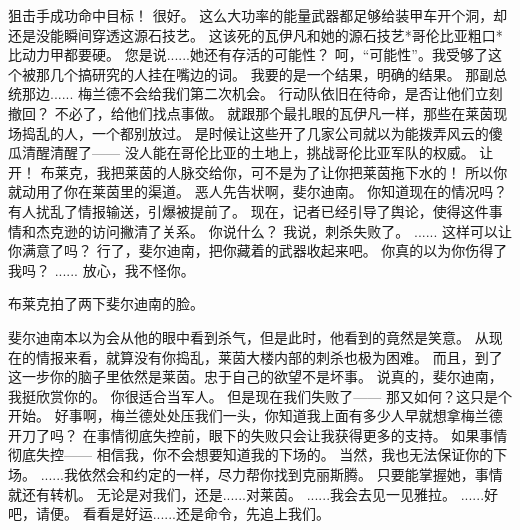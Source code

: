 \documentclass[openany]{book}
\begin{document}
\begin{dialogue}
     狙击手成功命中目标！
     很好。
     这么大功率的能量武器都足够给装甲车开个洞，却还是没能瞬间穿透这源石技艺。
     这该死的瓦伊凡和她的源石技艺*哥伦比亚粗口*比动力甲都要硬。
     您是说......她还有存活的可能性？
     呵，“可能性”。我受够了这个被那几个搞研究的人挂在嘴边的词。
     我要的是一个结果，明确的结果。
     那副总统那边......
     梅兰德不会给我们第二次机会。
     行动队依旧在待命，是否让他们立刻撤回？
     不必了，给他们找点事做。
     就跟那个最扎眼的瓦伊凡一样，那些在莱茵现场捣乱的人，一个都别放过。
     是时候让这些开了几家公司就以为能拨弄风云的傻瓜清醒清醒了——
     没人能在哥伦比亚的土地上，挑战哥伦比亚军队的权威。
     让开！
     布莱克，我把莱茵的人脉交给你，可不是为了让你把莱茵拖下水的！
     所以你就动用了你在莱茵里的渠道。
     恶人先告状啊，斐尔迪南。
     你知道现在的情况吗？
     有人扰乱了情报输送，引爆被提前了。
     现在，记者已经引导了舆论，使得这件事情和杰克逊的访问撇清了关系。
     你说什么？
     我说，刺杀失败了。
     ......
     这样可以让你满意了吗？
     行了，斐尔迪南，把你藏着的武器收起来吧。
     你真的以为你伤得了我吗？
     ......
     放心，我不怪你。\par
    布莱克拍了两下斐尔迪南的脸。\par
    斐尔迪南本以为会从他的眼中看到杀气，但是此时，他看到的竟然是笑意。
     从现在的情报来看，就算没有你捣乱，莱茵大楼内部的刺杀也极为困难。
     而且，到了这一步你的脑子里依然是莱茵。忠于自己的欲望不是坏事。
     说真的，斐尔迪南，我挺欣赏你的。
     你很适合当军人。
     但是现在我们失败了——
     那又如何？这只是个开始。
     好事啊，梅兰德处处压我们一头，你知道我上面有多少人早就想拿梅兰德开刀了吗？
     在事情彻底失控前，眼下的失败只会让我获得更多的支持。
     如果事情彻底失控——
     相信我，你不会想要知道我的下场的。
     当然，我也无法保证你的下场。
     ......我依然会和约定的一样，尽力帮你找到克丽斯腾。
     只要能掌握她，事情就还有转机。
     无论是对我们，还是......对莱茵。
     ......我会去见一见雅拉。
     ......好吧，请便。
     看看是好运......还是命令，先追上我们。
\end{dialogue}
\end{document}
